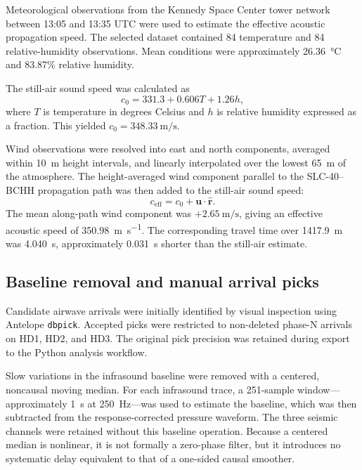 \documentclass[12pt]{article}
\begin{document}
Meteorological observations from the Kennedy Space Center tower network between
13:05 and 13:35 UTC were used to estimate the effective acoustic propagation
speed. The selected dataset contained 84 temperature and 84 relative-humidity
observations. Mean conditions were approximately \SI{26.36}{\degreeCelsius} and
83.87\% relative humidity.

The still-air sound speed was calculated as
\begin{equation}
  c_0 = 331.3 + 0.606T + 1.26h,
  \label{eq:still-air-sound-speed}
\end{equation}
where $T$ is temperature in degrees Celsius and $h$ is relative humidity
expressed as a fraction. This yielded
$c_0=\SI{348.33}{\metre\per\second}$.

Wind observations were resolved into east and north components, averaged within
\SI{10}{\metre} height intervals, and linearly interpolated over the lowest
\SI{65}{\metre} of the atmosphere. The height-averaged wind component parallel
to the SLC-40--BCHH propagation path was then added to the still-air sound speed:
\begin{equation}
  c_{\mathrm{eff}} = c_0 + \mathbf{u}\cdot\hat{\mathbf{r}}.
  \label{eq:effective-sound-speed}
\end{equation}
The mean along-path wind component was
$+\SI{2.65}{\metre\per\second}$, giving an effective acoustic speed of
\SI{350.98}{\metre\per\second}. The corresponding travel time over
\SI{1417.9}{\metre} was \SI{4.040}{\second}, approximately
\SI{0.031}{\second} shorter than the still-air estimate.

\subsection{Baseline removal and manual arrival picks}

Candidate airwave arrivals were initially identified by visual inspection using
Antelope \texttt{dbpick}. Accepted picks were restricted to non-deleted phase-N
arrivals on HD1, HD2, and HD3. The original pick precision was retained during
export to the Python analysis workflow.

Slow variations in the infrasound baseline were removed with a centered,
noncausal moving median. For each infrasound trace, a 251-sample window---
approximately \SI{1}{\second} at \SI{250}{\hertz}---was used to estimate the
baseline, which was then subtracted from the response-corrected pressure
waveform. The three seismic channels were retained without this baseline
operation. Because a centered median is nonlinear, it is not formally a
zero-phase filter, but it introduces no systematic delay equivalent to that of a
one-sided causal smoother.
\end{document}
